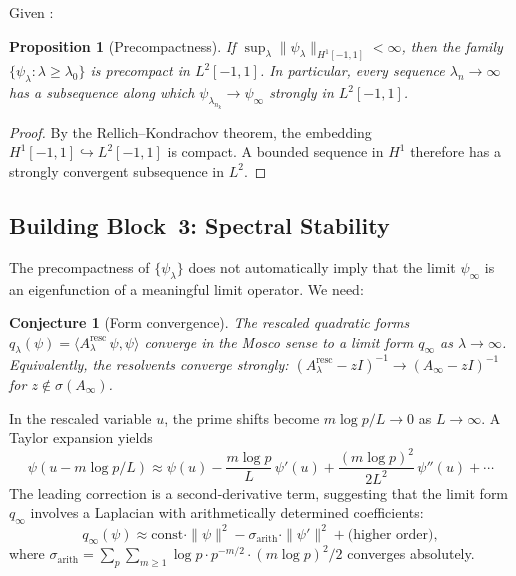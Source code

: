 \documentclass[12pt,a4paper]{article}
\newtheorem{proposition}[theorem]{Proposition}
\newtheorem{conjecture}[theorem]{Conjecture}
\theoremstyle{definition}
\theoremstyle{remark}
\begin{document}
Given :

\begin{proposition}[Precompactness]
\label{prop:precompact}
If $\sup_\lambda \|\psi_\lambda\|_{H^1[-1,1]} < \infty$, then the family $\{\psi_\lambda : \lambda \geq \lambda_0\}$ is precompact in $L^2[-1,1]$. In particular, every sequence $\lambda_n \to \infty$ has a subsequence along which $\psi_{\lambda_{n_k}} \to \psi_\infty$ strongly in $L^2[-1,1]$.
\end{proposition}

\begin{proof}
By the Rellich--Kondrachov theorem, the embedding $H^1[-1,1] \hookrightarrow L^2[-1,1]$ is compact. A bounded sequence in $H^1$ therefore has a strongly convergent subsequence in $L^2$.
\end{proof}

\subsection{Building Block~3: Spectral Stability}

The precompactness of $\{\psi_\lambda\}$ does not automatically imply that the limit $\psi_\infty$ is an eigenfunction of a meaningful limit operator. We need:

\begin{conjecture}[Form convergence]
\label{conj:mosco}
The rescaled quadratic forms $q_\lambda(\psi) = \langle A_\lambda^{\mathrm{resc}}\,\psi, \psi\rangle$ converge in the Mosco sense to a limit form $q_\infty$ as $\lambda \to \infty$. Equivalently, the resolvents converge strongly:
$(A_\lambda^{\mathrm{resc}} - zI)^{-1} \to (A_\infty - zI)^{-1}$ for $z \notin \sigma(A_\infty)$.
\end{conjecture}

In the rescaled variable $u$, the prime shifts become $m\log p / L \to 0$ as $L \to \infty$. A Taylor expansion yields
\[
  \psi(u - m\log p / L) \approx \psi(u) - \frac{m\log p}{L}\,\psi'(u) + \frac{(m\log p)^2}{2L^2}\,\psi''(u) + \cdots
\]
The leading correction is a second-derivative term, suggesting that the limit form $q_\infty$ involves a Laplacian with arithmetically determined coefficients:
\begin{equation}
\label{eq:limit-form}
q_\infty(\psi) \approx \mathrm{const} \cdot \|\psi\|^2 - \sigma_{\mathrm{arith}} \cdot \|\psi'\|^2 + \text{(higher order)},
\end{equation}
where $\sigma_{\mathrm{arith}} = \sum_p \sum_{m \geq 1} \log p \cdot p^{-m/2} \cdot (m\log p)^2 / 2$ converges absolutely.
\end{document}
